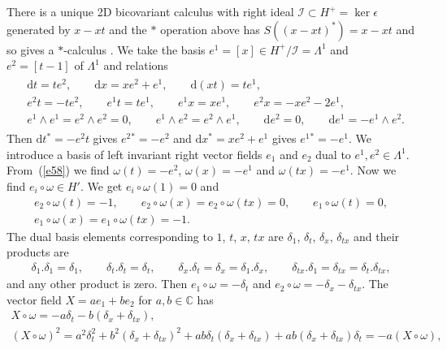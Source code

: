 \documentclass[pdftex]{sigma}
\numberwithin{equation}{section}
\newcommand{\extd}{\mathrm{d}}
\newcommand{\C}{\mathbb{C}}
\newcommand{\<}{\langle}
\renewcommand{\>}{\rangle}
\begin{document}
There is a unique 2D bicovariant calculus with right ideal $ \mathcal{I}\subset H^{+} = \ker\epsilon $ generated by $ x-xt $ and the $ * $ operation above has $ S((x-xt)^{*})= x-xt $ and so gives a $ * $-calculus \cite{BMbook}. We take the basis $ e^{1}=[x]\in H^{+}/\mathcal{I}=\Lambda ^{1}$ and $ e^{2}=[t-1] $ of $ \Lambda ^{1} $ and relations
\begin{gather*}
\begin{split}
&	\extd t =t e^{2}, \qquad \extd x= x e^{2}+e^{1}, \qquad \extd (x t)=t e^{1},\\
&	e^{2} t	=- t e^{2}, \qquad e^{1} t	= t e^{1}, \qquad e^{1} x= x e^{1}, \qquad e^{2} x= -x e^{2}-2e^{1},\\
&	e^{1} \wedge e^{1}=e^{2} \wedge e^{2}=0,\qquad e^{1} \wedge e^{2}= e^{2} \wedge e^{1}, \qquad \extd e^{2}=0, \qquad \extd e^{1}=- e^{1} \wedge e^{2}.
\end{split}
\end{gather*}
Then $ \extd t^{*}=-e^{2} t$ gives $ e^{2}{}^{*}=-e^{2} $ and $ \extd x^{*}= x e^{2}+ e^{1}$ gives $ e^{1}{}^{*}=- e^{1} $. We introduce a basis of left invariant right vector fields $ e_{1} $ and $ e_{2} $ dual to $ e^{1},e^{2} \in \Lambda^{1}$. From~(\ref{e58}) we find $ \omega (t)= -e^{2} $, $ \omega (x)= -e^{1} $ and $ \omega (tx)= -e^{1} $. Now we find $ e_{i}\circ \omega \in H' $. We get $ e_{i}\circ \omega (1)=0 $ and
\begin{gather*}
e_{2}\circ \omega (t)=-1, \qquad e_{2}\circ \omega (x)=e_{2}\circ \omega (tx)=0, \qquad e_{1}\circ \omega (t)=0, \\
 e_{1}\circ \omega (x)=e_{1}\circ \omega (tx)=-1.
\end{gather*}
The dual basis elements corresponding to $ 1$, $t$, $x$, $tx $ are $ \delta_{1}$, $\delta_{t}$, $\delta_{x}$, $\delta_{tx} $ and their products are
\begin{align*}
	\delta_{1}. \delta_{1}= \delta_{1}, \qquad \delta_{t}. \delta_{t}= \delta_{t}, \qquad \delta_{x}. \delta_{t}= \delta_{x}=\delta_{1}. \delta_{x}, \qquad \delta_{tx}. \delta_{1}= \delta_{tx}=\delta_{t}. \delta_{tx},
\end{align*}
and any other product is zero. Then $ e_{1}\circ \omega=-\delta_{t} $ and $ e_{2}\circ \omega=-\delta_{x} -\delta_{tx} $. The vector field $ X=a e_{1}+b e_{2}$ for $ a,b \in \C $ has
\begin{gather*}
X \circ \omega = -a \delta_{t}-b (\delta_{x} +\delta_{tx} ),\\
	(X \circ \omega)^{2}	 = a ^{2} \delta^{2}_{t}+b^{2}(\delta_{x} +\delta_{tx} )^{2}+ab \delta_{t}(\delta_{x} +\delta_{tx} )+ab (\delta_{x} +\delta_{tx} )\delta_{t}= -a (X \circ \omega),
\end{gather*}
\end{document}
